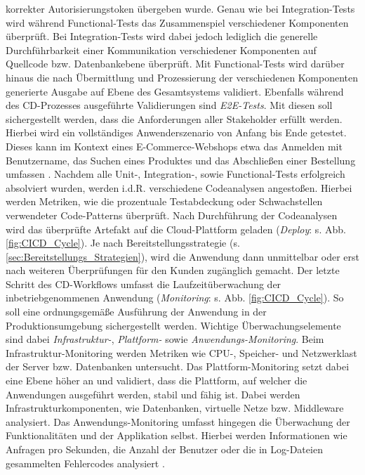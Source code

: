 korrekter Autorisierungstoken übergeben wurde. Genau wie bei Integration-Tests wird während Functional-Tests das Zusammenspiel verschiedener Komponenten überprüft. Bei Integration-Tests wird dabei jedoch lediglich die generelle Durchführbarkeit einer Kommunikation verschiedener Komponenten auf Quellcode bzw. Datenbankebene überprüft. Mit Functional-Tests wird darüber hinaus die nach Übermittlung und Prozessierung der verschiedenen Komponenten generierte Ausgabe auf Ebene des Gesamtsystems validiert. Ebenfalls während des CD-Prozesses ausgeführte Validierungen sind \textit{\ac{E2E-Tests}}. Mit diesen soll sichergestellt werden, dass die Anforderungen aller Stakeholder erfüllt werden. Hierbei wird ein vollständiges Anwenderszenario von Anfang bis Ende getestet. Dieses kann im Kontext eines E-Commerce-Webshops etwa das Anmelden mit Benutzername, das Suchen eines Produktes und das Abschließen einer Bestellung umfassen \cite{Bose.20230220}. Nachdem alle Unit-, Integration-, sowie Functional-Tests erfolgreich absolviert wurden, werden i.d.R. verschiedene Codeanalysen angestoßen. Hierbei werden Metriken, wie die prozentuale Testabdeckung oder Schwachstellen verwendeter Code-Patterns überprüft. Nach Durchführung der Codeanalysen wird das überprüfte Artefakt auf die Cloud-Plattform geladen (\textit{Deploy}: s. Abb. \ref*{fig:CICD_Cycle}). Je nach Bereitstellungsstrategie (s. \ref*{sec:Bereitstellungs_Strategien}), wird die Anwendung dann unmittelbar oder erst nach weiteren Überprüfungen für den Kunden zugänglich gemacht. Der letzte Schritt des CD-Workflows umfasst die Laufzeitüberwachung der inbetriebgenommenen Anwendung (\textit{Monitoring}: s. Abb. \ref*{fig:CICD_Cycle}). So soll eine ordnungsgemäße Ausführung der Anwendung in der Produktionsumgebung sichergestellt werden. Wichtige Überwachungselemente sind dabei \textit{Infrastruktur-}, \textit{Plattform-} sowie \textit{Anwendungs-Monitoring}. Beim Infrastruktur-Monitoring werden Metriken wie CPU-, Speicher- und Netzwerklast der Server bzw. Datenbanken untersucht. Das Plattform-Monitoring setzt dabei eine Ebene höher an und validiert, dass die Plattform, auf welcher die Anwendungen ausgeführt werden, stabil und fähig ist. Dabei werden Infrastrukturkomponenten, wie Datenbanken, virtuelle Netze bzw. Middleware analysiert. Das Anwendungs-Moni\-toring umfasst hingegen die Überwachung der Funktionalitäten und der Applikation selbst. Hierbei werden Informationen wie Anfragen pro Sekunden, die Anzahl der Benutzer oder die in Log-Dateien gesammelten Fehlercodes analysiert \cite[21]{Halstenberg.2020}. 

